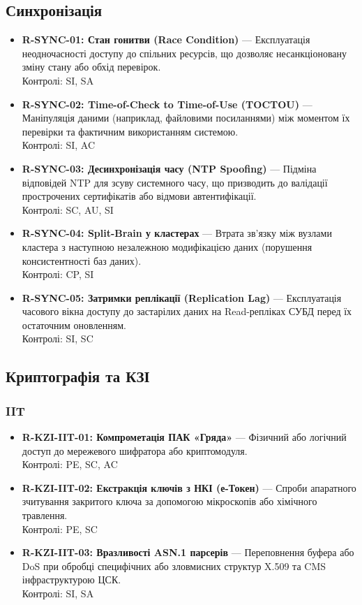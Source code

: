 \documentclass{article}
\begin{document}
\subsection{Синхронізація}
\begin{itemize}
\item \textbf{R-SYNC-01: Стан гонитви (Race Condition)} — Експлуатація неодночасності доступу до спільних ресурсів, що дозволяє несанкціоновану зміну стану або обхід перевірок.
\\ Контролі: SI, SA
\item \textbf{R-SYNC-02: Time-of-Check to Time-of-Use (TOCTOU)} — Маніпуляція даними (наприклад, файловими посиланнями) між моментом їх перевірки та фактичним використанням системою.
\\ Контролі: SI, AC
\item \textbf{R-SYNC-03: Десинхронізація часу (NTP Spoofing)} — Підміна відповідей NTP для зсуву системного часу, що призводить до валідації прострочених сертифікатів або відмови автентифікації.
\\ Контролі: SC, AU, SI
\item \textbf{R-SYNC-04: Split-Brain у кластерах} — Втрата зв'язку між вузлами кластера з наступною незалежною модифікацією даних (порушення консистентності баз даних).
\\ Контролі: CP, SI
\item \textbf{R-SYNC-05: Затримки реплікації (Replication Lag)} — Експлуатація часового вікна доступу до застарілих даних на Read-репліках СУБД перед їх остаточним оновленням.
\\ Контролі: SI, SC\end{itemize}

\subsection{Криптографія та КЗІ}
\subsubsection{IIT}
\begin{itemize}
\item \textbf{R-KZI-IIT-01: Компрометація ПАК «Гряда»} — Фізичний або логічний доступ до мережевого шифратора або криптомодуля.
\\ Контролі: PE, SC, AC
\item \textbf{R-KZI-IIT-02: Екстракція ключів з НКІ (е-Токен)} — Спроби апаратного зчитування закритого ключа за допомогою мікроскопів або хімічного травлення.
\\ Контролі: PE, SC
\item \textbf{R-KZI-IIT-03: Вразливості ASN.1 парсерів} — Переповнення буфера або DoS при обробці специфічних або зловмисних структур X.509 та CMS інфраструктурою ЦСК.
\\ Контролі: SI, SA\end{itemize}
\end{document}
